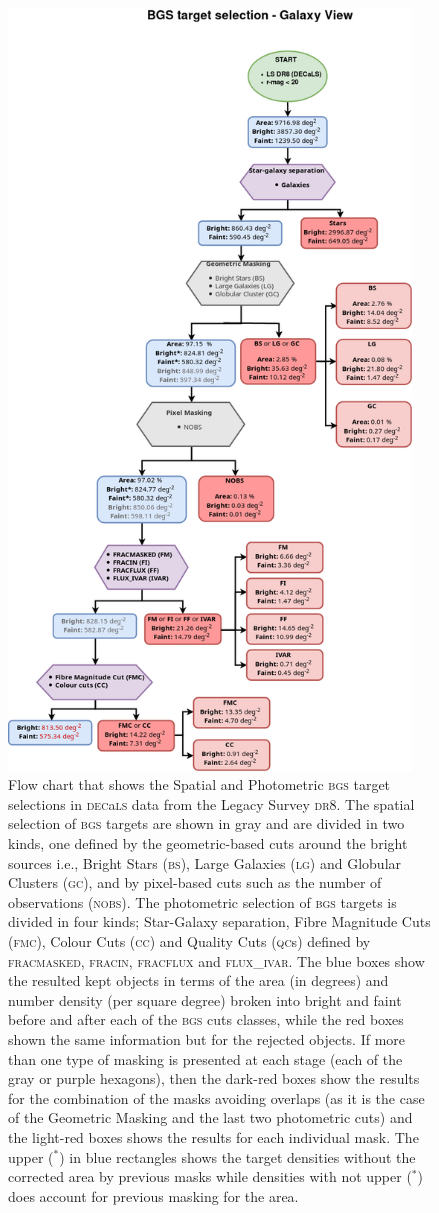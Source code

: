 \documentclass[fleqn,usenatbib]{mnras}
\newcommand{\BGS}{\textsc{bgs}\xspace}
\newcommand{\BS}{\textsc{bs}\xspace}
\newcommand{\CC}{\textsc{cc}\xspace}
\newcommand{\DECaLS}{\textsc{dec}a\textsc{ls}\xspace}
\newcommand{\DReight}{\textsc{dr8}\xspace}
\newcommand{\FLUXIVAR}{{\textsc{ flux\_ivar}}\xspace}
\newcommand{\FMC}{{\textsc{fmc}}\xspace}
\newcommand{\FRACMASKED}{{\textsc{fracmasked}}\xspace}
\newcommand{\FRACFLUX}{{\textsc{fracflux}}\xspace}
\newcommand{\FRACIN}{{\textsc{fracin}}\xspace}
\newcommand{\GC}{\textsc{gc}\xspace}
\newcommand{\LG}{\textsc{lg}\xspace}
\newcommand{\NOBS}{\textsc{nobs}\xspace}
\newcommand{\QCs}{\textsc{qc}s\xspace}
\begin{document}
\begin{figure}
	\includegraphics[width=10.7cm]{images/flow_galaxy.png}
    \caption{Flow chart that shows the Spatial and Photometric \BGS target selections in \DECaLS data from the Legacy Survey \DReight. The spatial selection of \BGS targets are shown in gray and are divided in two kinds, one defined by the geometric-based cuts around the bright sources i.e., Bright Stars (\BS), Large Galaxies (\LG) and Globular Clusters (\GC), and by pixel-based cuts such as the number of observations (\NOBS). The photometric selection of \BGS targets is divided in four kinds; Star-Galaxy separation, Fibre Magnitude Cuts (\FMC), Colour Cuts (\CC) and Quality Cuts (\QCs) defined by \FRACMASKED, \FRACIN, \FRACFLUX and \FLUXIVAR. The blue boxes show the resulted kept objects in terms of the area (in degrees) and number density (per square degree) broken into bright and faint before and after each of the \BGS cuts classes, while the red boxes shown the same information but for the rejected objects. If more than one type of masking is presented at each stage (each of the gray or purple hexagons), then the dark-red boxes show the results for the combination of the masks avoiding overlaps (as it is the case of the Geometric Masking and the last two photometric cuts) and the light-red boxes shows the results for each individual mask. The upper ($^*$) in blue rectangles shows the target densities without the corrected area by previous masks while densities with not upper ($^*$) does account for previous masking for the area.}

\end{figure}
\end{document}
